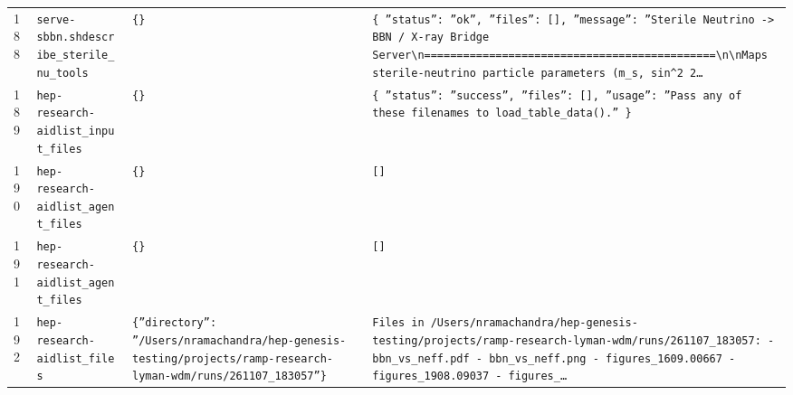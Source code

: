 \documentclass[11pt,a4paper]{article}
\begin{document}
\begin{longtable}{@{}p{}p{}p{}p{}@{}}
188 & \texttt{serve-sbbn.sh}\newline\texttt{describe\_\allowbreak{}sterile\_\allowbreak{}nu\_\allowbreak{}tools} & \texttt{\{\}\allowbreak{}} & \texttt{\{   ''status'':\allowbreak{} ''ok'',\allowbreak{}   ''files'':\allowbreak{} []\allowbreak{},\allowbreak{}   ''message'':\allowbreak{} ''Sterile Neutrino -\textgreater{}\allowbreak{} BBN /\allowbreak{} X-ray Bridge Server\textbackslash{}\allowbreak{}n=\allowbreak{}=\allowbreak{}=\allowbreak{}=\allowbreak{}=\allowbreak{}=\allowbreak{}=\allowbreak{}=\allowbreak{}=\allowbreak{}=\allowbreak{}=\allowbreak{}=\allowbreak{}=\allowbreak{}=\allowbreak{}=\allowbreak{}=\allowbreak{}=\allowbreak{}=\allowbreak{}=\allowbreak{}=\allowbreak{}=\allowbreak{}=\allowbreak{}=\allowbreak{}=\allowbreak{}=\allowbreak{}=\allowbreak{}=\allowbreak{}=\allowbreak{}=\allowbreak{}=\allowbreak{}=\allowbreak{}=\allowbreak{}=\allowbreak{}=\allowbreak{}=\allowbreak{}=\allowbreak{}=\allowbreak{}=\allowbreak{}=\allowbreak{}=\allowbreak{}=\allowbreak{}=\allowbreak{}=\allowbreak{}=\allowbreak{}=\allowbreak{}\textbackslash{}\allowbreak{}n\textbackslash{}\allowbreak{}nMaps sterile-neutrino particle parameters (m\_\allowbreak{}s,\allowbreak{} sin\textasciicircum{}\allowbreak{}2 2\ldots{}\allowbreak{}} \\
189 & \texttt{hep-research-aid}\newline\texttt{list\_\allowbreak{}input\_\allowbreak{}files} & \texttt{\{\}\allowbreak{}} & \texttt{\{   ''status'':\allowbreak{} ''success'',\allowbreak{}   ''files'':\allowbreak{} []\allowbreak{},\allowbreak{}   ''usage'':\allowbreak{} ''Pass any of these filenames to load\_\allowbreak{}table\_\allowbreak{}data()\allowbreak{}.'' \}\allowbreak{}} \\
190 & \texttt{hep-research-aid}\newline\texttt{list\_\allowbreak{}agent\_\allowbreak{}files} & \texttt{\{\}\allowbreak{}} & \texttt{[]\allowbreak{}} \\
191 & \texttt{hep-research-aid}\newline\texttt{list\_\allowbreak{}agent\_\allowbreak{}files} & \texttt{\{\}\allowbreak{}} & \texttt{[]\allowbreak{}} \\
192 & \texttt{hep-research-aid}\newline\texttt{list\_\allowbreak{}files} & \texttt{\{''directory'':\allowbreak{} ''/\allowbreak{}Users/\allowbreak{}nramachandra/\allowbreak{}hep-genesis-testing/\allowbreak{}projects/\allowbreak{}ramp-research-lyman-wdm/\allowbreak{}runs/\allowbreak{}261107\_\allowbreak{}183057''\}\allowbreak{}} & \texttt{Files in /\allowbreak{}Users/\allowbreak{}nramachandra/\allowbreak{}hep-genesis-testing/\allowbreak{}projects/\allowbreak{}ramp-research-lyman-wdm/\allowbreak{}runs/\allowbreak{}261107\_\allowbreak{}183057:\allowbreak{}   - bbn\_\allowbreak{}vs\_\allowbreak{}neff.pdf   - bbn\_\allowbreak{}vs\_\allowbreak{}neff.png   - figures\_\allowbreak{}1609.00667   - figures\_\allowbreak{}1908.09037   - figures\_\allowbreak{}\ldots{}\allowbreak{}} \\

\end{longtable}
\end{document}
